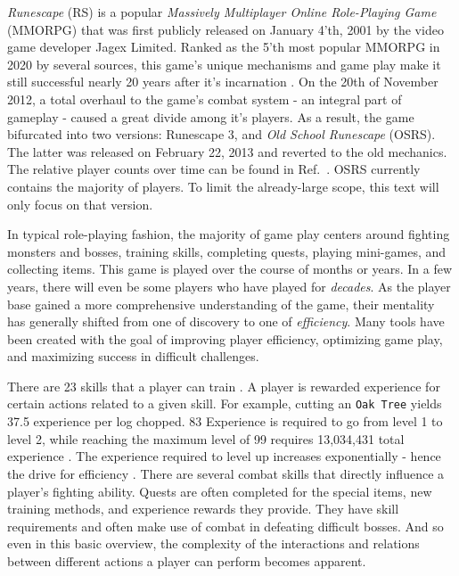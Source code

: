 \textit{Runescape} (RS) is a popular \textit{Massively Multiplayer Online Role-Playing Game} (MMORPG) that was first publicly released on January 4'th, 2001 by the video game developer Jagex Limited. Ranked as the 5'th most popular MMORPG in 2020 by several sources, this game's unique mechanisms and game play make it still successful nearly 20 years after it's incarnation \cite{bestreamer:10_most_played_mmorpgs_of_2020, altarofgaming:top_6_most_popular_mmorpgs, thegamer:ranking_the_15_best_mmorpgs}.
On the 20th of November 2012, a total overhaul to the game's combat system - an integral part of gameplay - caused a great divide among it's players. As a result, the game bifurcated into two versions: Runescape 3, and \textit{Old School Runescape} (OSRS). The latter was released on February 22, 2013 and reverted to the old mechanics. The relative player counts over time can be found in Ref.~\cite{misplacedme:relative_player_counts}. OSRS currently contains the majority of players. To limit the already-large scope, this text will only focus on that version.

In typical role-playing fashion, the majority of game play centers around fighting monsters and bosses, training skills, completing quests, playing mini-games, and collecting items. This game is played over the course of months or years. In a few years, there will even be some players who have played for \emph{decades}. As the player base gained a more comprehensive understanding of the game, their mentality has generally shifted from one of discovery to one of \emph{efficiency}. Many tools have been created with the goal of improving player efficiency, optimizing game play, and maximizing success in difficult challenges. %

There are 23 skills that a player can train \cite{wiki:skills}. A player is rewarded experience for certain actions related to a given skill. For example, cutting an \texttt{Oak Tree} yields 37.5 experience per log chopped. 83 Experience is required to go from level 1 to level 2, while reaching the maximum level of 99 requires 13,034,431 total experience \cite{wiki:experience}. The experience required to level up increases exponentially - hence the drive for efficiency \cite{wiki:experience}. There are several combat skills that directly influence a player's fighting ability. Quests are often completed for the special items, new training methods, and experience rewards they provide. They have skill requirements and often make use of combat in defeating difficult bosses. And so even in this basic overview, the complexity of the interactions and relations between different actions a player can perform becomes apparent.


